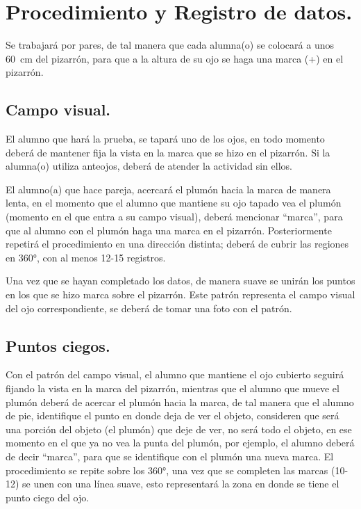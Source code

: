 \documentclass[14pt]{extarticle}
\begin{document}
\section{Procedimiento y Registro de datos.}

Se trabajará por pares, de tal manera que cada alumna(o) se colocará a unos \SI{60}{\centi\meter} del pizarrón, para que a la altura de su ojo se haga una marca (+) en el pizarrón.

\subsection{Campo visual.}

El alumno que hará la prueba, se tapará uno de los ojos, en todo momento deberá de mantener fija la vista en la marca que se hizo en el pizarrón. Si la alumna(o) utiliza anteojos, deberá de atender la actividad sin ellos.

El alumno(a) que hace pareja, acercará el plumón hacia la marca de manera lenta, en el momento que el alumno que mantiene su ojo tapado vea el plumón (momento en el que entra a su campo visual), deberá mencionar \enquote{marca}, para que al alumno con el plumón haga una marca en el pizarrón. Posteriormente repetirá el procedimiento en una dirección distinta; deberá de cubrir las regiones en \ang{360}, con al menos 12-15 registros.

Una vez que se hayan completado los datos, de manera suave se unirán los puntos en los que se hizo marca sobre el pizarrón. Este patrón representa el campo visual del ojo correspondiente, se deberá de tomar una foto con el patrón.

\subsection{Puntos ciegos.}

Con el patrón del campo visual, el alumno que mantiene el ojo cubierto seguirá fijando la vista en la marca del pizarrón, mientras que el alumno que mueve el plumón deberá de acercar el plumón hacia la marca, de tal manera que el alumno de pie, identifique el punto en donde deja de ver el objeto, consideren que será una porción del objeto (el plumón) que deje de ver, no será todo el objeto, en ese momento en el que ya no vea la punta del plumón, por ejemplo, el alumno deberá de decir \enquote{marca}, para que se identifique con el plumón una nueva marca. El procedimiento se repite sobre los \ang{360}, una vez que se completen las marcas (10-12) se unen con una línea suave, esto representará la zona en donde se tiene el punto ciego del ojo.
\end{document}
